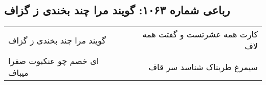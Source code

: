 \begin{center}
\section*{رباعی شماره ۱۰۶۳: گویند مرا چند بخندی ز گزاف}
\label{sec:1063}
\begin{longtable}{l p{0.5cm} r}
گویند مرا چند بخندی ز گزاف
&&
کارت همه عشرتست و گفتت همه لاف
\\
ای خصم چو عنکبوت صفرا میباف
&&
سیمرغ طربناک شناسد سر قاف
\\
\end{longtable}
\end{center}
